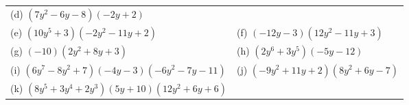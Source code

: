 \begin{enumerate}[noitemsep, label=\textbf{\arabic*}. ]
{\begin{tabular}[t]{|l|l|}
        (d) $\left(7{y}^{2}-6y-8\right)\left(-2y+2\right)$%
     \tabularnewline\cline{1-1}\cline{2-2}
        (e) $\left(10{y}^{5}+3\right)\left(-2{y}^{2}-11y+2\right)$ &
        (f) $\left(-12y-3\right)\left(12{y}^{2}-11y+3\right)$%
     \tabularnewline\cline{1-1}\cline{2-2}
        (g) $\left(-10\right)\left(2{y}^{2}+8y+3\right)$ &
        (h) $\left(2{y}^{6}+3{y}^{5}\right)\left(-5y-12\right)$%
     \tabularnewline\cline{1-1}\cline{2-2}
        (i) $\left(6{y}^{7}-8{y}^{2}+7\right)\left(-4y-3\right)\left(-6{y}^{2}-7y-11\right)$ &
        (j) $\left(-9{y}^{2}+11y+2\right)\left(8{y}^{2}+6y-7\right)$%
     \tabularnewline\cline{1-1}\cline{2-2}
        (k) $\left(8{y}^{5}+3{y}^{4}+2{y}^{3}\right)\left(5y+10\right)\left(12{y}^{2}+6y+6\right)$ &

\end{tabular}}
\end{enumerate}
